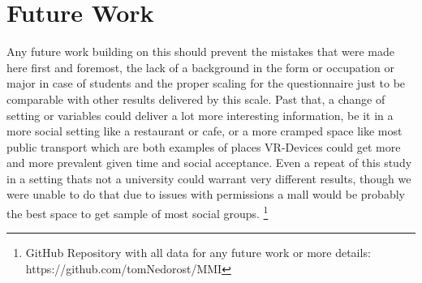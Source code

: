 \documentclass[sigchi]{acmart}
\begin{document}
\section {Future Work}
Any future work building on this should prevent the mistakes that were made here first and foremost, the lack of a background in the form or occupation or major in case of students and the proper scaling for the questionnaire just to be comparable with other results delivered by this scale. Past that, a change of setting or variables could deliver a lot more interesting information, be it in a more social setting like a restaurant or cafe, or a more cramped space like most public transport which are both examples of places VR-Devices could get more and more prevalent given time and social acceptance.  Even a repeat of this study in a setting thats not a university could warrant very different results, though we were unable to do that due to issues with permissions a mall would be probably the best space to get sample of most social groups. 
\footnote{GitHub Repository with all data for any future work or more details: https://github.com/tomNedorost/MMI}



\appendix
\listoffigures
\end{document}

